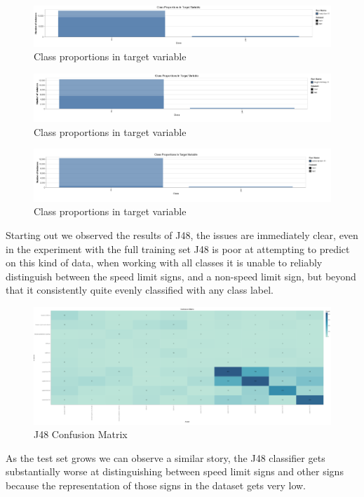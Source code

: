 \documentclass[11pt]{article}
\begin{document}
\begin{figure}[h]
  \caption {Class proportions in target variable}
  \centering 
  \includegraphics[width = \textwidth, height = 0.5\textheight, keepaspectratio]{Images/Sec1Original.png}
\end{figure}


\begin{figure}[h]
  \caption {Class proportions in target variable}
  \centering 
  \includegraphics[width = \textwidth, height = 0.5\textheight, keepaspectratio]{Images/Sec1-4k.png}
\end{figure}


\begin{figure}[h]
  \caption {Class proportions in target variable}
  \centering 
  \includegraphics[width = \textwidth, height = 0.5\textheight, keepaspectratio]{Images/Sec1-9k.png}
\end{figure}


Starting out we observed the results of J48, the issues are immediately clear, even in the experiment with the full training set J48 is poor at attempting to predict on this kind of data, when working with all classes it is unable to reliably distinguish between the speed limit signs, and a non-speed limit sign, but beyond that it consistently quite evenly classified with any class label.

\begin{figure}[h!]
  \caption {J48 Confusion Matrix}
  \centering 
  \includegraphics[width = \textwidth, height = 0.3\textheight, keepaspectratio]{Images/J48ConfMat.png}
\end{figure}
\FloatBarrier
As the test set grows we can observe a similar story, the J48 classifier gets substantially worse at distinguishing between speed limit signs and other signs because the representation of those signs in the dataset gets very low.
\end{document}
